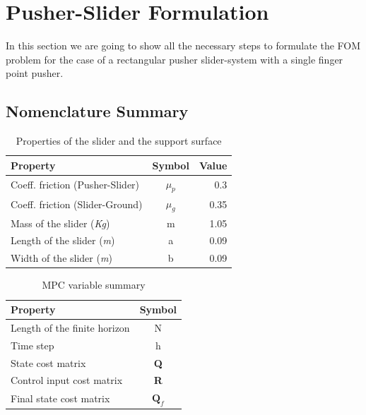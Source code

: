 \documentclass[12,twoside]{TFG-GM}
\theoremstyle{definition}
\theoremstyle{remark}
\begin{document}
\section{Pusher-Slider Formulation}
\label{sec:formulation}
In this section we are going to show all the necessary steps to formulate the FOM problem for the case of a rectangular pusher slider-system with a single finger point pusher.

\subsection{Nomenclature Summary}
\label{subsec:nomenclature}
\begin{table}[H]
\begin{center}
  \begin{tabular}{| l  c  r |}
    \hline
    Property & Symbol & Value \\ \hline
    Coeff. friction (Pusher-Slider)& $\mu_p$ & 0.3 \\
    Coeff. friction (Slider-Ground)& $\mu_g$ & 0.35 \\
    Mass of the slider (\textit{Kg}) & m & 1.05 \\
    Length of the slider (\textit{m}) & a & 0.09 \\
    Width of the slider (\textit{m}) & b & 0.09 \\
    \hline
  \end{tabular}
  \caption {Properties of the slider and the support surface}
\end{center}
\end{table}


\begin{table}[H]
\begin{center}
  \begin{tabular}{| l c |}
    \hline
    Property & Symbol \\ \hline
    Length of the finite horizon & N \\
    Time step & h \\    
    State cost matrix & \textbf{Q} \\
    Control input cost matrix & \textbf{R} \\    
    Final state cost matrix & $\textbf{Q}_f$ \\    
    \hline
  \end{tabular}
  \caption {MPC variable summary}
\end{center}
\end{table}
\end{document}
